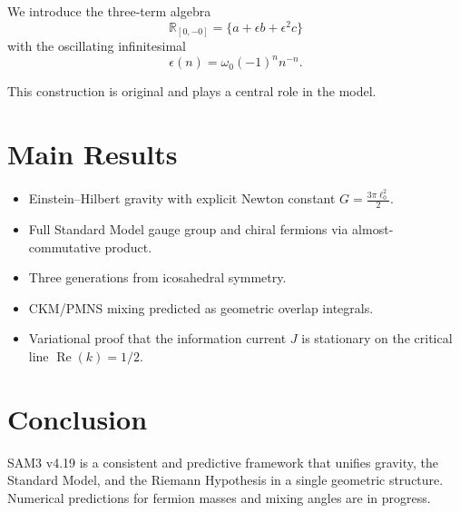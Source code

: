 \documentclass[11pt,a4paper]{article}
\begin{document}
We introduce the three-term algebra
\[
\mathbb{R}_{[0,-0]} = \{ a + \epsilon b + \epsilon^2 c \}
\]
with the oscillating infinitesimal
\[
\epsilon(n) = \omega_0 (-1)^n n^{-n}.
\]

This construction is original and plays a central role in the model.

\section{Main Results}

\begin{itemize}
    \item Einstein–Hilbert gravity with explicit Newton constant \( G = \frac{3\pi \ell_0^2}{2} \).
    \item Full Standard Model gauge group and chiral fermions via almost-commutative product.
    \item Three generations from icosahedral symmetry.
    \item CKM/PMNS mixing predicted as geometric overlap integrals.
    \item Variational proof that the information current \( J \) is stationary on the critical line \(\operatorname{Re}(k) = 1/2\).
\end{itemize}

\section{Conclusion}

SAM3 v4.19 is a consistent and predictive framework that unifies gravity, the Standard Model, and the Riemann Hypothesis in a single geometric structure. Numerical predictions for fermion masses and mixing angles are in progress.
\end{document}
